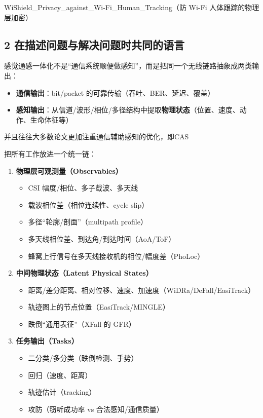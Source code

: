 \documentclass[
]{article}
\begin{document}
WiShield\_Privacy\_against\_Wi-Fi\_Human\_Tracking（防 Wi-Fi
人体跟踪的物理层加密）

\subsection{2
在描述问题与解决问题时共同的语言}\label{2-ux5728ux63cfux8ff0ux95eeux9898ux4e0eux89e3ux51b3ux95eeux9898ux65f6ux5171ux540cux7684ux8bedux8a00}

感觉通感一体化不是``通信系统顺便做感知''，而是把同一个无线链路抽象成两类输出：

\begin{itemize}
\item
  \textbf{通信输出}：bit/packet 的可靠传输（吞吐、BER、延迟、覆盖）
\item
  \textbf{感知输出}：从信道/波形/相位/多径结构中提取\textbf{物理状态}（位置、速度、动作、生命体征等）
\end{itemize}

并且往往大多数论文更加注重通信辅助感知的优化，即CAS

把所有工作放进一个统一链：

\begin{enumerate}
\def\labelenumi{\arabic{enumi}.}
\item
  \textbf{物理层可观测量（Observables）}

  \begin{itemize}
  \item
    CSI 幅度/相位、多子载波、多天线
  \item
    载波相位差（相位连续性、cycle slip）
  \item
    多径``轮廓/剖面''（multipath profile）
  \item
    多天线相位差、到达角/到达时间（AoA/ToF）
  \item
    蜂窝上行信号在多天线接收机的相位/幅度差（PhoLoc）
  \end{itemize}
\item
  \textbf{中间物理状态（Latent Physical States）}

  \begin{itemize}
  \item
    距离/差分距离、相对位移、速度、加速度（WiDRa/DeFall/EasiTrack）
  \item
    轨迹图上的节点位置（EasiTrack/MINGLE）
  \item
    跌倒``通用表征''（XFall 的 GFR）
  \end{itemize}
\item
  \textbf{任务输出（Tasks）}

  \begin{itemize}
  \item
    二分类/多分类（跌倒检测、手势）
  \item
    回归（速度、距离）
  \item
    轨迹估计（tracking）
  \item
    攻防（窃听成功率 vs 合法感知/通信质量）
  \end{itemize}
\end{enumerate}
\end{document}
